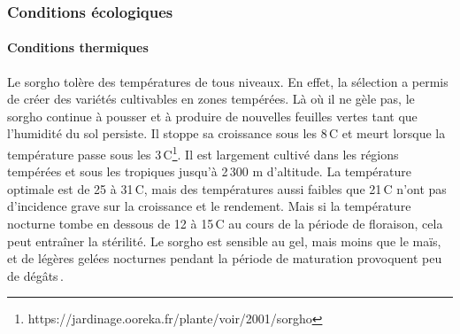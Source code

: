 \documentclass[a4paper,11pt]{article}
\begin{document}
\subsubsection{Conditions écologiques}

\paragraph{Conditions thermiques} Le sorgho tolère des températures de
tous niveaux. En effet, la sélection a permis de créer des variétés
cultivables en zones tempérées. Là où il ne gèle pas, le sorgho
continue à pousser et à produire de nouvelles feuilles vertes tant que
l’humidité du sol persiste. Il stoppe sa croissance sous les
8\,\degree{}C et meurt lorsque la température passe sous les
3\,\degree{}C\footnote{https://jardinage.ooreka.fr/plante/voir/2001/sorgho}. Il
est largement cultivé dans les régions tempérées et sous les tropiques
jusqu’à 2\,300 m d’altitude. La température optimale est de 25 à
31\,\degree{}C, mais des températures aussi faibles que 21\,\degree{}C
n’ont pas d’incidence grave sur la croissance et le rendement. Mais si
la température nocturne tombe en dessous de 12 à 15\,\degree{}C au
cours de la période de floraison, cela peut entraîner la stérilité. Le
sorgho est sensible au gel, mais moins que le maïs, et de légères
gelées nocturnes pendant la période de maturation provoquent peu de
dégâts\,\cite{BARRO_KONDOMBO_2010}.
\end{document}
